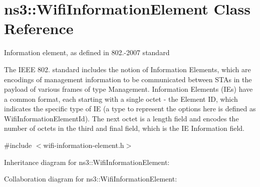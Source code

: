 \hypertarget{classns3_1_1WifiInformationElement}{}\section{ns3\+:\+:Wifi\+Information\+Element Class Reference}
\label{classns3_1_1WifiInformationElement}


Information element, as defined in 802.-\/2007 standard

The I\+E\+EE 802. standard includes the notion of Information Elements, which are encodings of management information to be communicated between S\+T\+As in the payload of various frames of type Management. Information Elements (I\+Es) have a common format, each starting with a single octet -\/ the Element ID, which indicates the specific type of IE (a type to represent the options here is defined as Wifi\+Information\+Element\+Id). The next octet is a length field and encodes the number of octets in the third and final field, which is the IE Information field.  




{\ttfamily \#include $<$wifi-\/information-\/element.\+h$>$}



Inheritance diagram for ns3\+:\+:Wifi\+Information\+Element\+:


Collaboration diagram for ns3\+:\+:Wifi\+Information\+Element\+:

